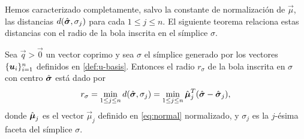 Hemos caracterizado completamente, salvo la constante de normalización de $\vec{\mu}$, las
distancias $d(\hat{\boldsymbol{ \sigma }}, \sigma_j)$ para cada $1 \leq j \leq n$. El siguiente teorema relaciona
estas distancias con el radio de la bola inscrita en el símplice $\sigma$.
\begin{theorem}
	\label{lemma:sigma-radius}
	Sea $\vec{q} > \vec{0}$ un vector coprimo y sea $\sigma$ el símplice generado por los vectores
	$\lbrace \boldsymbol{u}_i \rbrace_{i=1}^{n}$ definidos en \eqref{def:u-basis}. Entonces el radio $r_\sigma$ de
	la bola inscrita en $\sigma$ con centro $\hat{\boldsymbol{ \sigma }}$ está dado por
	\begin{equation*}
		r_\sigma = \min_{1 \leq j \leq n} d(\hat{\boldsymbol{ \sigma }}, \sigma_j)
		= \min_{1 \leq j \leq n} \hat{\boldsymbol{\mu}}_j^T(\hat{\boldsymbol{ \sigma }} - \hat{\boldsymbol{ \sigma }}_j),
	\end{equation*}
	donde $\hat{\boldsymbol{\mu}}_j$ es el vector $\vec{\mu}_j$ definido en \eqref{eq:normal} normalizado, y
	$\sigma_j$ es la $j$-ésima faceta del símplice $\sigma$.
\end{theorem}
